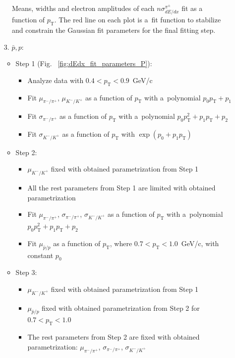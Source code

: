 \begin{figure}[h!]
\begin{subfigure}{.32\textwidth}
	\end{subfigure}
	\begin{minipage}{.64\textwidth}
		\caption{Means, widths and electron amplitudes of each $n\sigma^{\pi^\pm}_{dE/dx}$ fit as a function of $p_\textrm{T}$.  The red line on each plot is a~fit function to stabilize and constrain the Gaussian fit parameters for the final fitting step.}
		\label{fig:dEdx_fit_parametersPi}
	\end{minipage}
	
\end{figure}
\begin{enumerate}
	\item[3.] $\bar{p},p$:
	\begin{itemize}
		\item Step 1 (Fig. ~\ref{fig:dEdx_fit_parameters_P}):
		\begin{itemize}
			\renewcommand\labelitemi{--}
			\item Analyze data with $0.4 < p_\textrm{T} < 0.9$~GeV/c
			\item Fit  $\mu_{\pi^-/\pi^+}$, $\mu_{K^-/K^+}$   as a function of $p_\textrm{T}$ with a~polynomial  $p_0p_\textrm{T}+p_1$ 
			\item Fit  $\sigma_{\pi^-/\pi^+}$  as a function of $p_\textrm{T}$ with a~polynomial $p_0p_\textrm{T}^2+p_1p_\textrm{T}+p_2$ 
			\item Fit $\sigma_{K^-/K^+}$ as a function of $p_\textrm{T}$ with $\exp\left(p_0+p_1p_\textrm{T}\right)$
		\end{itemize}
		\item Step 2:
		\begin{itemize}
			\renewcommand\labelitemi{--}
			\item $\mu_{K^-/K^+}$ fixed with obtained parametrization from Step 1
			\item All the rest parameters from Step 1 are limited with obtained parametrization
			\item Fit  $\mu_{\pi^-/\pi^+}$, $\sigma_{\pi^-/\pi^+}$, $\sigma_{K^-/K^+}$  as a function of $p_\textrm{T}$ with a~polynomial $p_0p_\textrm{T}^2+p_1p_\textrm{T}+p_2$ 
			\item Fit  $\mu_{\bar{p}/p}$  as a function of $p_\textrm{T}$, where $0.7<p_\textrm{T}<1.0$~GeV/c, with constant $p_0$ 
			
		\end{itemize}
		\item Step 3:
		\begin{itemize}
			\renewcommand\labelitemi{--}
			\item  $\mu_{K^-/K^+}$ fixed with obtained parametrization from Step 1
			\item $\mu_{\bar{p}/p}$  fixed with obtained parametrization from Step 2 for $0.7<p_\textrm{T}<1.0$
			\item  The rest parameters from Step 2 are fixed with obtained parametrization: $\mu_{\pi^-/\pi^+}$, $\sigma_{\pi^-/\pi^+}$, $\sigma_{K^-/K^+}$
		\end{itemize}		
	\end{itemize}		
\end{enumerate} 



